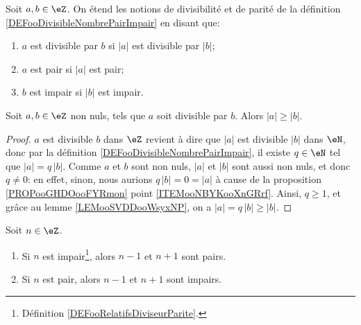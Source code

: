 \begin{definition}	\label{DEFooRelatifsDiviseurParite}
	Soit \( a, b \in \eZ \). On étend les notions de divisibilité et de parité de la définition \ref{DEFooDivisibleNombrePairImpair} en disant que:
	\begin{enumerate}
		\item
		      \( a \) est divisible par \( b \) si \( |a| \) est divisible par \( |b| \);
		\item
		      \( a \) est pair si \( |a| \) est pair;
		\item
		      \( b \) est impair si \( |b| \) est impair.
	\end{enumerate}
\end{definition}

\begin{proposition} \label{PROPooYJBMooZrzkNX}
	Soit \( a,b\in \eZ\) non nuls, tels que \( a\) soit divisible par \( b\). Alors \( | a |\geq | b |\).
\end{proposition}

\begin{proof}
	\( a\) est divisible \( b\) dans \( \eZ \) revient à dire que \( |a| \) est divisible \( |b| \) dans \( \eN \), donc par la définition \ref{DEFooDivisibleNombrePairImpair}, il existe \( q \in \eN \) tel que \( |a| = q\, |b| \). Comme \( a \) et \( b \) sont non nuls, \( |a| \) et \( |b| \) sont aussi non nuls, et donc \( q \neq 0 \): en effet, sinon, nous aurions \( q\, |b| = 0 = |a| \) à cause de la proposition \ref{PROPooGHDOooFYRmon} point \ref{ITEMooNBYKooXnGRrf}. Ainsi, \( q \geq 1 \), et grâce au lemme \ref{LEMooSVDDooWsyxNP}, on a \(|a| = q\, |b| \geq |b| \).
\end{proof}

\begin{lemma}	\label{LEMooCMOEooSoeclk}
	Soit \( n\in \eZ\).
	\begin{enumerate}
		\item
		      Si \( n\) est impair\footnote{Définition \ref{DEFooRelatifsDiviseurParite}.}, alors \( n-1\) et \( n+1\) sont pairs.
		\item
		      Si \( n\) est pair, alors \( n-1\) et \( n+1\) sont impairs.
	\end{enumerate}
\end{lemma}

